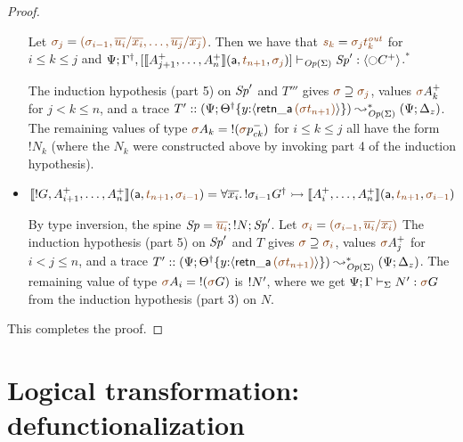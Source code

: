\begin{proof}
\begin{itemize}
   \smallskip
    
   Let
   $\lf{\sigma_j} = \lf{(\sigma_{i-1},
                   \overline{u_i}/\overline{x_i},\ldots,
                   \overline{u_j}/\overline{x_j})}$.
   Then we have that $\lf{s_k} = \lf{{\sigma_j}t^{\it out}_k}$ 
   for $i \leq k \leq j$ and
   $\slst{\transop{\Sigma}}{\Psi}{\opsubst{\Gamma},[\opbasic{A^+_{j+1},\ldots,A^+_n}{t_{n+1}}{\sigma_{j}}]}{\Sp'}{\susp{{\ocircle}C^+}}$.$^*$

  \smallskip

 The induction 
   hypothesis (part 5) on ${\it Sp}'$ and $T'''$
  gives $\lf{\sigma} \supseteq \lf{\sigma_{j}}$, values
  $\lf{\sigma}{A^+_{k}}$ for $j < k \leq n$, and 
  a trace $T' :: (\Psi; \tackon{\opsubst{\Theta}}{y{:}\susp{{\sf retn\_a}\,\lf{(\sigma t_{n+1})}}})
  \leadsto^*_{\transop{\Sigma}}
 (\Psi; \Delta_z)$. The remaining values of type
   $\lf{\sigma}A_k = {!}(\lf{\sigma}p^-_{ck})$ for $i \leq k \leq j$
   all have the form ${!}N_k$ (where the $N_k$ were constructed above by
   invoking part 4 of the induction hypothesis).
   \bigskip


\item $\opbasic{{!}G,A^+_{i+1},\ldots,A^+_n}{t_{n+1}}{\sigma_{i-1}} = \forall
  \overline{x_i}.\, {!}\sigma_{i-1}\opsubst{G} \lefti
  \opbasic{A^+_i,\ldots,A^+_n}{t_{n+1}}{\sigma_{i-1}}$

  \bigskip
  By type inversion, the spine $\Sp = \lf{\overline{u_i}}; {!}N; \Sp'$. 
  Let $\lf{\sigma_i} = \lf{(\sigma_{i-1}, \overline{u_i}/\overline{x_i})}$
  The induction hypothesis (part 5) on ${\it Sp}'$ and $T$
  gives $\lf{\sigma} \supseteq \lf{\sigma_{i}}$, values
  $\lf{\sigma}{A^+_{j}}$ for $i < j \leq n$, and 
  a trace $T' :: (\Psi; \tackon{\opsubst{\Theta}}{y{:}\susp{{\sf retn\_a}\,\lf{(\sigma t_{n+1})}}})
  \leadsto^*_{\transop{\Sigma}}
 (\Psi; \Delta_z)$. The remaining value of type 
  $\lf\sigma A_i = {!}(\lf{\sigma}G)$
  is ${!}{N'}$, where we get $\slst{\Sigma}{\Psi}{\Gamma}{N'}{\lf{\sigma}{G}}$ from the induction hypothesis (part 3) on $N$.
\end{itemize}
\smallskip

\noindent
This completes the proof.
\end{proof}


\section{Logical transformation: defunctionalization}
\label{sec:defunctionalization}

